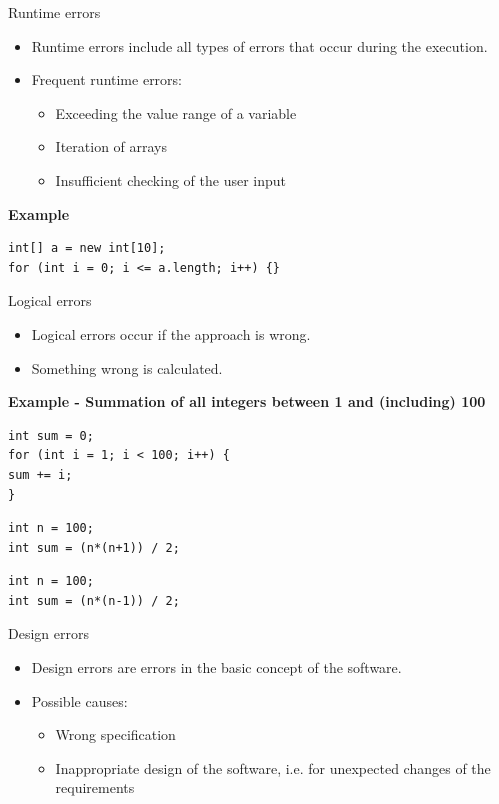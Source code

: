 \begin{frame}[fragile]{Runtime errors}
\begin{itemize}
	\item Runtime errors include all types of errors that occur during the execution.
	\item Frequent runtime errors:
\begin{itemize}
	\item Exceeding the value range of a variable
	\item Iteration of arrays
	\item Insufficient checking of the user input
\end{itemize}
\end{itemize}
\textbf{Example}
\begin{lstlisting}
int[] a = new int[10];
for (int i = 0; i <= a.length; i++) {}
\end{lstlisting}
\end{frame}

\begin{frame}[fragile]{Logical errors}
\begin{itemize}
	\item Logical errors occur if the approach is wrong.
	\item Something wrong is calculated.
	\end{itemize}
	\textbf{Example - Summation of all integers between 1 and (including) 100}
\begin{lstlisting}
int sum = 0;
for (int i = 1; i < 100; i++) {
sum += i;
}
\end{lstlisting}
\begin{lstlisting}
int n = 100;
int sum = (n*(n+1)) / 2;
\end{lstlisting}
\begin{lstlisting}
int n = 100;
int sum = (n*(n-1)) / 2;
\end{lstlisting}
\end{frame}

\begin{frame}{Design errors}
\begin{itemize}
	\item Design errors are errors in the basic concept of the software.
	\item Possible causes:
	\begin{itemize}
		\item Wrong specification
		\item Inappropriate design of the software, i.e. for unexpected changes of the requirements
	\end{itemize}
\end{itemize}
\end{frame}


